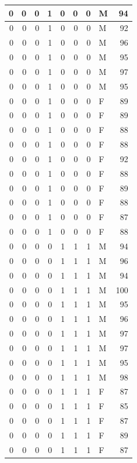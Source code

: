 \documentclass[
  12pt,
]{krantz}
\begin{document}
\begin{tabular}{r|r|r|r|r|r|r|l|r}
\hline
0 & 0 & 0 & 1 & 0 & 0 & 0 & M & 94\\
\hline
0 & 0 & 0 & 1 & 0 & 0 & 0 & M & 92\\
\hline
0 & 0 & 0 & 1 & 0 & 0 & 0 & M & 96\\
\hline
0 & 0 & 0 & 1 & 0 & 0 & 0 & M & 95\\
\hline
0 & 0 & 0 & 1 & 0 & 0 & 0 & M & 97\\
\hline
0 & 0 & 0 & 1 & 0 & 0 & 0 & M & 95\\
\hline
0 & 0 & 0 & 1 & 0 & 0 & 0 & F & 89\\
\hline
0 & 0 & 0 & 1 & 0 & 0 & 0 & F & 89\\
\hline
0 & 0 & 0 & 1 & 0 & 0 & 0 & F & 88\\
\hline
0 & 0 & 0 & 1 & 0 & 0 & 0 & F & 88\\
\hline
0 & 0 & 0 & 1 & 0 & 0 & 0 & F & 92\\
\hline
0 & 0 & 0 & 1 & 0 & 0 & 0 & F & 88\\
\hline
0 & 0 & 0 & 1 & 0 & 0 & 0 & F & 89\\
\hline
0 & 0 & 0 & 1 & 0 & 0 & 0 & F & 88\\
\hline
0 & 0 & 0 & 1 & 0 & 0 & 0 & F & 87\\
\hline
0 & 0 & 0 & 1 & 0 & 0 & 0 & F & 88\\
\hline
0 & 0 & 0 & 0 & 1 & 1 & 1 & M & 94\\
\hline
0 & 0 & 0 & 0 & 1 & 1 & 1 & M & 96\\
\hline
0 & 0 & 0 & 0 & 1 & 1 & 1 & M & 94\\
\hline
0 & 0 & 0 & 0 & 1 & 1 & 1 & M & 100\\
\hline
0 & 0 & 0 & 0 & 1 & 1 & 1 & M & 95\\
\hline
0 & 0 & 0 & 0 & 1 & 1 & 1 & M & 96\\
\hline
0 & 0 & 0 & 0 & 1 & 1 & 1 & M & 97\\
\hline
0 & 0 & 0 & 0 & 1 & 1 & 1 & M & 97\\
\hline
0 & 0 & 0 & 0 & 1 & 1 & 1 & M & 95\\
\hline
0 & 0 & 0 & 0 & 1 & 1 & 1 & M & 98\\
\hline
0 & 0 & 0 & 0 & 1 & 1 & 1 & F & 87\\
\hline
0 & 0 & 0 & 0 & 1 & 1 & 1 & F & 85\\
\hline
0 & 0 & 0 & 0 & 1 & 1 & 1 & F & 87\\
\hline
0 & 0 & 0 & 0 & 1 & 1 & 1 & F & 89\\
\hline
0 & 0 & 0 & 0 & 1 & 1 & 1 & F & 87\\

\end{tabular}
\end{document}
